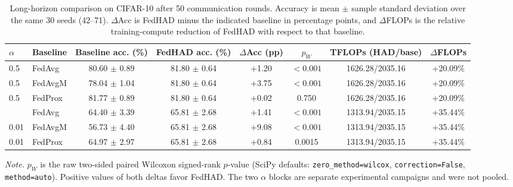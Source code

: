 \begin{table}[t]
\centering
\caption{Long-horizon comparison on CIFAR-10 after 50 communication rounds. Accuracy is mean $\pm$ sample standard deviation over the same 30 seeds (42--71). $\Delta$Acc is FedHAD minus the indicated baseline in percentage points, and $\Delta$FLOPs is the relative training-compute reduction of FedHAD with respect to that baseline.}
\label{tab:long_horizon_alpha_comparison}
\small
\setlength{\tabcolsep}{4pt}
\begin{tabular}{llcccccc}
\toprule
$\alpha$ & Baseline & Baseline acc. (\%) & FedHAD acc. (\%) & $\Delta$Acc (pp) & $p_{W}$ & TFLOPs (HAD/base) & $\Delta$FLOPs \\
\midrule
0.5 & FedAvg & 80.60 $\pm$ 0.89 & 81.80 $\pm$ 0.64 & +1.20 & $<0.001$ & 1626.28/2035.16 & +20.09\% \\
0.5 & FedAvgM & 78.04 $\pm$ 1.04 & 81.80 $\pm$ 0.64 & +3.75 & $<0.001$ & 1626.28/2035.16 & +20.09\% \\
0.5 & FedProx & 81.77 $\pm$ 0.89 & 81.80 $\pm$ 0.64 & +0.02 & 0.750 & 1626.28/2035.16 & +20.09\% \\
\addlinespace
0.01 & FedAvg & 64.40 $\pm$ 3.39 & 65.81 $\pm$ 2.68 & +1.41 & $<0.001$ & 1313.94/2035.15 & +35.44\% \\
0.01 & FedAvgM & 56.73 $\pm$ 4.40 & 65.81 $\pm$ 2.68 & +9.08 & $<0.001$ & 1313.94/2035.15 & +35.44\% \\
0.01 & FedProx & 64.97 $\pm$ 2.97 & 65.81 $\pm$ 2.68 & +0.84 & 0.0015 & 1313.94/2035.15 & +35.44\% \\
\bottomrule
\end{tabular}
\vspace{2pt}
{\footnotesize\raggedright \textit{Note.} $p_W$ is the raw two-sided paired Wilcoxon signed-rank $p$-value (SciPy defaults: \texttt{zero\_method=wilcox}, \texttt{correction=False}, \texttt{method=auto}). Positive values of both deltas favor FedHAD. The two $\alpha$ blocks are separate experimental campaigns and were not pooled.\par}
\end{table}
